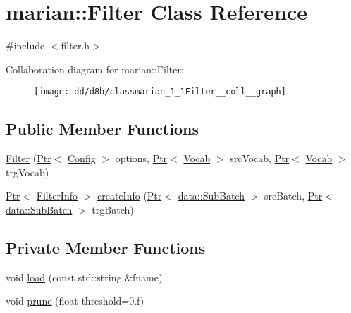 \hypertarget{classmarian_1_1Filter}{}\section{marian\+:\+:Filter Class Reference}
\label{classmarian_1_1Filter}


{\ttfamily \#include $<$filter.\+h$>$}



Collaboration diagram for marian\+:\+:Filter\+:
\nopagebreak
\begin{figure}[H]
\begin{center}
\leavevmode
\texttt{[image: dd/d8b/classmarian\_1\_1Filter\_\_coll\_\_graph]}
\end{center}
\end{figure}
\subsection*{Public Member Functions}
\begin{DoxyCompactItemize}
\item 
\hyperlink{classmarian_1_1Filter_a06b1bb4499db641fc5515da686ec81a4}{Filter} (\hyperlink{namespacemarian_ad1a373be43a00ef9ce35666145137b08}{Ptr}$<$ \hyperlink{classmarian_1_1Config}{Config} $>$ options, \hyperlink{namespacemarian_ad1a373be43a00ef9ce35666145137b08}{Ptr}$<$ \hyperlink{classmarian_1_1Vocab}{Vocab} $>$ src\+Vocab, \hyperlink{namespacemarian_ad1a373be43a00ef9ce35666145137b08}{Ptr}$<$ \hyperlink{classmarian_1_1Vocab}{Vocab} $>$ trg\+Vocab)
\item 
\hyperlink{namespacemarian_ad1a373be43a00ef9ce35666145137b08}{Ptr}$<$ \hyperlink{classmarian_1_1FilterInfo}{Filter\+Info} $>$ \hyperlink{classmarian_1_1Filter_a8d8273bc026392ffd220d2cb5314b60c}{create\+Info} (\hyperlink{namespacemarian_ad1a373be43a00ef9ce35666145137b08}{Ptr}$<$ \hyperlink{classmarian_1_1data_1_1SubBatch}{data\+::\+Sub\+Batch} $>$ src\+Batch, \hyperlink{namespacemarian_ad1a373be43a00ef9ce35666145137b08}{Ptr}$<$ \hyperlink{classmarian_1_1data_1_1SubBatch}{data\+::\+Sub\+Batch} $>$ trg\+Batch)
\end{DoxyCompactItemize}
\subsection*{Private Member Functions}
\begin{DoxyCompactItemize}
\item 
void \hyperlink{classmarian_1_1Filter_af947fe56dd94605ee2cbf8959918d1bf}{load} (const std\+::string \&fname)
\item 
void \hyperlink{classmarian_1_1Filter_ad3de142a4ea393d5ceffbedbf7bbc14f}{prune} (float threshold=0.f)
\end{DoxyCompactItemize}
